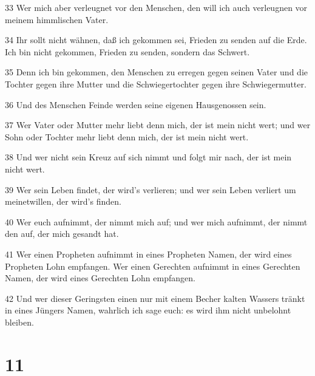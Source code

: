 \par 33 Wer mich aber verleugnet vor den Menschen, den will ich auch verleugnen vor meinem himmlischen Vater.
\par 34 Ihr sollt nicht wähnen, daß ich gekommen sei, Frieden zu senden auf die Erde. Ich bin nicht gekommen, Frieden zu senden, sondern das Schwert.
\par 35 Denn ich bin gekommen, den Menschen zu erregen gegen seinen Vater und die Tochter gegen ihre Mutter und die Schwiegertochter gegen ihre Schwiegermutter.
\par 36 Und des Menschen Feinde werden seine eigenen Hausgenossen sein.
\par 37 Wer Vater oder Mutter mehr liebt denn mich, der ist mein nicht wert; und wer Sohn oder Tochter mehr liebt denn mich, der ist mein nicht wert.
\par 38 Und wer nicht sein Kreuz auf sich nimmt und folgt mir nach, der ist mein nicht wert.
\par 39 Wer sein Leben findet, der wird's verlieren; und wer sein Leben verliert um meinetwillen, der wird's finden.
\par 40 Wer euch aufnimmt, der nimmt mich auf; und wer mich aufnimmt, der nimmt den auf, der mich gesandt hat.
\par 41 Wer einen Propheten aufnimmt in eines Propheten Namen, der wird eines Propheten Lohn empfangen. Wer einen Gerechten aufnimmt in eines Gerechten Namen, der wird eines Gerechten Lohn empfangen.
\par 42 Und wer dieser Geringsten einen nur mit einem Becher kalten Wassers tränkt in eines Jüngers Namen, wahrlich ich sage euch: es wird ihm nicht unbelohnt bleiben.

\chapter{11}

